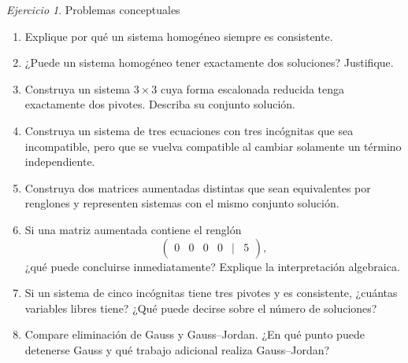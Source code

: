 \documentclass[12pt]{article}
\theoremstyle{remark}
\newtheorem{Ejer}[definicion]{Ejercicio}
\begin{document}
\begin{Ejer} Problemas conceptuales

\begin{enumerate}[resume]

\item Explique por qué un sistema homogéneo siempre es consistente.

\item ¿Puede un sistema homogéneo tener exactamente dos soluciones? Justifique.

\item Construya un sistema $3\times3$ cuya forma escalonada reducida tenga exactamente
dos pivotes. Describa su conjunto solución.

\item Construya un sistema de tres ecuaciones con tres incógnitas que sea incompatible,
pero que se vuelva compatible al cambiar solamente un término independiente.

\item Construya dos matrices aumentadas distintas que sean equivalentes por renglones
y representen sistemas con el mismo conjunto solución.

\item Si una matriz aumentada contiene el renglón
\[
\begin{pmatrix}0&0&0&0&|&5\end{pmatrix},
\]
¿qué puede concluirse inmediatamente? Explique la interpretación algebraica.

\item Si un sistema de cinco incógnitas tiene tres pivotes y es consistente, ¿cuántas
variables libres tiene? ¿Qué puede decirse sobre el número de soluciones?

\item Compare eliminación de Gauss y Gauss--Jordan. ¿En qué punto puede detenerse
Gauss y qué trabajo adicional realiza Gauss--Jordan?

\end{enumerate}
\end{Ejer}
\end{document}
